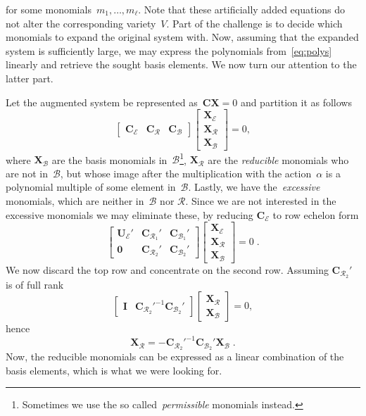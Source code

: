 \documentclass[11pt,a4paper]{article}
\theoremstyle{definition}
\newcommand{\mat}[1]{\bm{#1}}
\newcommand{\CE}{\ensuremath{\mat{C}_\mathcal{E}}}
\newcommand{\CR}{\ensuremath{\mat{C}_\mathcal{R}}}
\newcommand{\CB}{\ensuremath{\mat{C}_\mathcal{B}}}
\newcommand{\CRk}[1]{\ensuremath{\mat{C}_{\mathcal{R}_{#1}}}}
\newcommand{\CBk}[1]{\ensuremath{\mat{C}_{\mathcal{B}_{#1}}}}
\newcommand{\XE}{\ensuremath{\mat{X}_\mathcal{E}}}
\newcommand{\XR}{\ensuremath{\mat{X}_\mathcal{R}}}
\newcommand{\XB}{\ensuremath{\mat{X}_\mathcal{B}}}
\begin{document}
for some monomials~$m_1,\ldots, m_\ell$. Note that these artificially added equations do not alter
the corresponding variety~$V$.
Part of the challenge is to decide which monomials to expand the original system with.
Now, assuming that the expanded system is sufficiently large, we may express the polynomials
from~\eqref{eq:polys} linearly and retrieve the sought basis elements. We now turn our attention
to the latter part.

Let the augmented system be represented as~$\mat{CX}=0$ and partition it as follows
\begin{equation}
    \begin{bmatrix}
        \CE &
        \CR &
        \CB
    \end{bmatrix}
    \begin{bmatrix}
        \XE \\
        \XR \\
        \XB
    \end{bmatrix}
    = 0,
\end{equation}
where $\XB$ are the basis monomials in~$\mathcal{B}$\footnote{Sometimes we use the so called~\emph{permissible} monomials instead.},
$\XR$ are the \emph{reducible} monomials who are
not in~$\mathcal{B}$, but whose image after the multiplication with the action~$\alpha$ is a
polynomial multiple of some element in~$\mathcal{B}$. Lastly, we have the~\emph{excessive}
monomials, which are neither in~$\mathcal{B}$ nor $\mathcal{R}$.
Since we are not interested in the excessive monomials we may eliminate these,
by reducing $\CE$ to row echelon form
\begin{equation}
    \begin{bmatrix}
        \mat{U}_\mathcal{E}' &
        \CRk{1}' &
        \CBk{1}' \\
        \mat{0} &
        \CRk{2}' &
        \CBk{2}'
    \end{bmatrix}
    \begin{bmatrix}
        \XE \\
        \XR \\
        \XB
    \end{bmatrix}
    = 0\;.
\end{equation}
We now discard the top row and concentrate on the second row. Assuming $\CRk{2}'$ is of full rank
\begin{equation}
    \begin{bmatrix}
        \mat{I} &
        \CRk{2}'^{-1}\CBk{2}'
    \end{bmatrix}
    \begin{bmatrix}
        \XR \\
        \XB
    \end{bmatrix}
    = 0,
\end{equation}
hence
\begin{equation}
    \XR = -\CRk{2}'^{-1}\CBk{2}'\XB\;.
\end{equation}
Now, the reducible monomials can be expressed as a linear combination of the basis elements,
which is what we were looking for.
\end{document}
